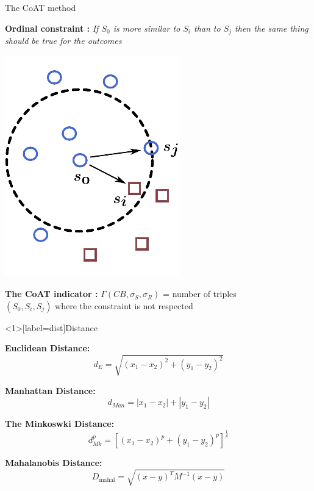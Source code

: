 \begin{frame}{The CoAT method}
    
    \vspace{0.25cm}

    \begin{mdframed}[style=box] %
         \textbf{Ordinal constraint :} \emph{If $S_0$ is more similar to $S_i$ than to $S_j$ then the same thing should be true for the outcomes}
     \end{mdframed}
    
    \vspace{0.25cm}
    
    \begin{center}
        \includegraphics[scale=0.25]{img/logos/pretty.png}
    \end{center}
    
    \vspace{0.25cm}

    \begin{mdframed}[style=box]
         \textbf{The CoAT indicator :} $\Gamma (CB, \sigma_S, \sigma_R)$ = number of triples \\$(S_0, S_i, S_j)$ where the constraint is not respected
     \end{mdframed}
    
\end{frame}


\begin{frame}<1>[label=dist]{Distance} %

    \vspace{0.5cm} %
    
    \textbf{Euclidean Distance:} $$d_E = \sqrt{(x_1 - x_2)^2+(y_1 - y_2)^2}$$

    \textbf{Manhattan Distance:} $$ d_{Man} = |x_1-x_2|+|y_1-y_2|$$

    \textbf{The Minkoswki Distance:} $$d_{Mk}^p =  [(x_1-x_2)^p + (y_1-y_2)^p]^{\frac{1}{p}} $$

    \textbf{Mahalanobis Distance:} $$D_{\text{mahal}}= \sqrt{(x-y)^T M^{-1} (x-y)}$$
    
\end{frame}

